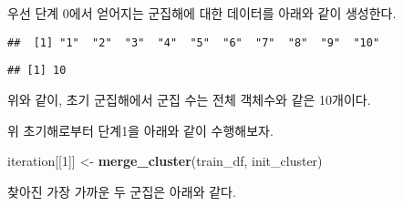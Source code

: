 \documentclass[]{book}
\newenvironment{Shaded}{\begin{snugshade}}{\end{snugshade}}
\newcommand{\DataTypeTok}[1]{\textcolor[rgb]{0.13,0.29,0.53}{#1}}
\newcommand{\DecValTok}[1]{\textcolor[rgb]{0.00,0.00,0.81}{#1}}
\newcommand{\KeywordTok}[1]{\textcolor[rgb]{0.13,0.29,0.53}{\textbf{#1}}}
\newcommand{\NormalTok}[1]{#1}
\newcommand{\OperatorTok}[1]{\textcolor[rgb]{0.81,0.36,0.00}{\textbf{#1}}}
\newcommand{\StringTok}[1]{\textcolor[rgb]{0.31,0.60,0.02}{#1}}
\begin{document}
우선 단계 0에서 얻어지는 군집해에 대한 데이터를 아래와 같이 생성한다.

\begin{Shaded}
\end{Shaded}

\begin{verbatim}
##  [1] "1"  "2"  "3"  "4"  "5"  "6"  "7"  "8"  "9"  "10"
\end{verbatim}

\begin{Shaded}
\end{Shaded}

\begin{verbatim}
## [1] 10
\end{verbatim}

위와 같이, 초기 군집해에서 군집 수는 전체 객체수와 같은 10개이다.

위 초기해로부터 단계1을 아래와 같이 수행해보자.

\begin{Shaded}
\begin{Highlighting}[]
\NormalTok{iteration[[}\DecValTok{1}\NormalTok{]] <-}\StringTok{ }\KeywordTok{merge_cluster}\NormalTok{(train_df, init_cluster)}
\end{Highlighting}
\end{Shaded}

찾아진 가장 가까운 두 군집은 아래와 같다.

\begin{Shaded}
\end{Shaded}
\end{document}
